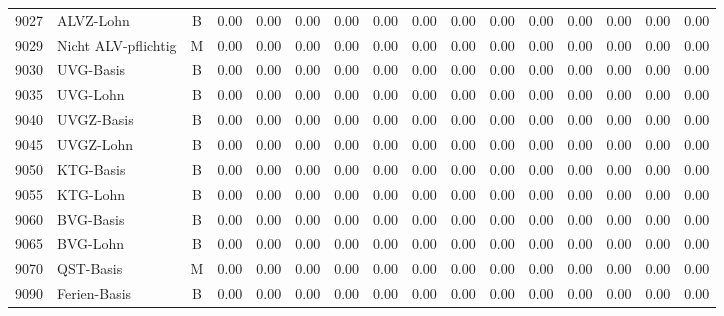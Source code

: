 \documentclass[8pt,a4paper]{extarticle}
\begin{document}
\begin{longtable}{@{\extracolsep{\fill}} l l c r r r r r r r r r r r r r}
9027&ALVZ-Lohn&B&0.00&0.00&0.00&0.00&0.00&0.00&0.00&0.00&0.00&0.00&0.00&0.00&0.00\\
9029&Nicht ALV-pflichtig&M&0.00&0.00&0.00&0.00&0.00&0.00&0.00&0.00&0.00&0.00&0.00&0.00&0.00\\
9030&UVG-Basis&B&0.00&0.00&0.00&0.00&0.00&0.00&0.00&0.00&0.00&0.00&0.00&0.00&0.00\\
9035&UVG-Lohn&B&0.00&0.00&0.00&0.00&0.00&0.00&0.00&0.00&0.00&0.00&0.00&0.00&0.00\\
9040&UVGZ-Basis&B&0.00&0.00&0.00&0.00&0.00&0.00&0.00&0.00&0.00&0.00&0.00&0.00&0.00\\
9045&UVGZ-Lohn&B&0.00&0.00&0.00&0.00&0.00&0.00&0.00&0.00&0.00&0.00&0.00&0.00&0.00\\
9050&KTG-Basis&B&0.00&0.00&0.00&0.00&0.00&0.00&0.00&0.00&0.00&0.00&0.00&0.00&0.00\\
9055&KTG-Lohn&B&0.00&0.00&0.00&0.00&0.00&0.00&0.00&0.00&0.00&0.00&0.00&0.00&0.00\\
9060&BVG-Basis&B&0.00&0.00&0.00&0.00&0.00&0.00&0.00&0.00&0.00&0.00&0.00&0.00&0.00\\
9065&BVG-Lohn&B&0.00&0.00&0.00&0.00&0.00&0.00&0.00&0.00&0.00&0.00&0.00&0.00&0.00\\
9070&QST-Basis&M&0.00&0.00&0.00&0.00&0.00&0.00&0.00&0.00&0.00&0.00&0.00&0.00&0.00\\
9090&Ferien-Basis&B&0.00&0.00&0.00&0.00&0.00&0.00&0.00&0.00&0.00&0.00&0.00&0.00&0.00\\

\end{longtable}
\pagebreak
\end{document}
